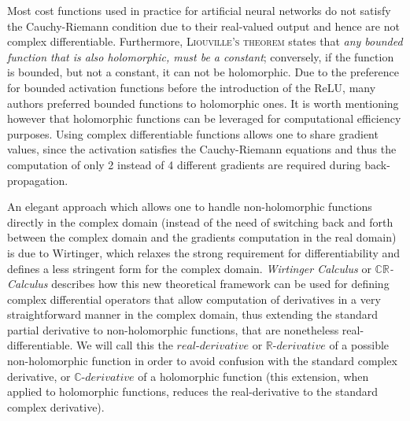 \documentclass[11pt]{article}
\begin{document}
Most cost functions used in practice for artificial neural networks do not satisfy the Cauchy-Riemann condition due to their  real-valued output and hence are not complex differentiable. Furthermore, \textsc{Liouville's theorem} states that \textit{any bounded function that is also holomorphic, must be a constant}; conversely, if the function is bounded, but not a constant, it can not be holomorphic. Due to the preference for bounded activation functions before the introduction of the ReLU, many authors preferred bounded functions to holomorphic ones. It is worth mentioning however that holomorphic functions can be leveraged for computational efficiency purposes. Using complex differentiable functions allows one to share gradient values, since the activation satisfies the Cauchy-Riemann equations and thus the computation of only 2 instead of 4 different gradients are required during back-propagation.

An elegant approach which allows one to handle non-holomorphic functions directly in the complex domain (instead of the need of switching back and forth between the complex domain and the gradients computation in the real domain) is due to Wirtinger, which relaxes the strong requirement for differentiability and defines a  less stringent form for the complex domain. \textit{Wirtinger Calculus} or $\mathbb C\mathbb R$\textit{-Calculus} describes how this new theoretical framework can be used for defining complex differential operators that allow computation of derivatives in a very straightforward manner in the complex domain, thus extending the standard partial derivative to non-holomorphic functions, that are nonetheless real-differentiable. We will call this the $\textit{real-derivative}$  or $\mathbb R\textit{-derivative}$ of a possible non-holomorphic function in order to avoid confusion with the standard complex derivative, or $\mathbb C\textit{-derivative}$ of a holomorphic function (this extension, when applied to holomorphic functions, reduces the real-derivative to the standard complex derivative).
\end{document}
